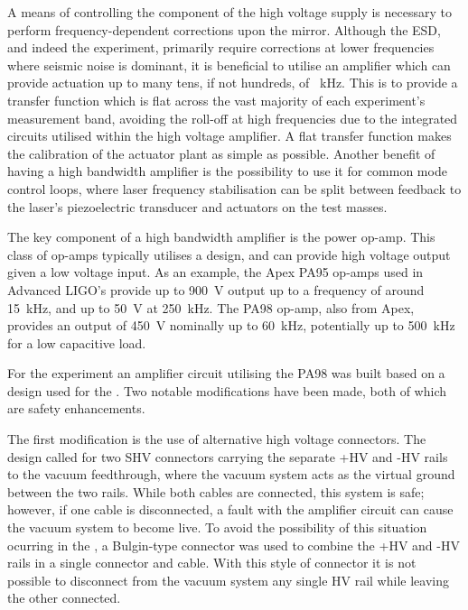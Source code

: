 A means of controlling the \AC{} component of the high voltage supply is necessary to perform frequency-dependent corrections upon the mirror. Although the ESD, and indeed the \SSM{} experiment, primarily require corrections at lower frequencies where seismic noise is dominant, it is beneficial to utilise an amplifier which can provide actuation up to many tens, if not hundreds, of \SI{}{\kilo\hertz}. This is to provide a transfer function which is flat across the vast majority of each experiment's measurement band, avoiding the roll-off at high frequencies due to the integrated circuits utilised within the high voltage amplifier. A flat transfer function makes the calibration of the actuator plant as simple as possible. Another benefit of having a high bandwidth amplifier is the possibility to use it for common mode control loops, where laser frequency stabilisation can be split between feedback to the laser's piezoelectric transducer and actuators on the test masses.

The key component of a high bandwidth amplifier is the power op-amp. This class of op-amps typically utilises a \MOSFET{} design, and can provide high voltage output given a low voltage input. As an example, the Apex PA95 op-amps used in Advanced LIGO's \ESDs{} provide up to \SI{900}{\volt} output up to a frequency of around \SI{15}{\kilo\hertz}, and up to \SI{50}{\volt} at \SI{250}{\kilo\hertz}. The PA98 op-amp, also from Apex, provides an output of \SI{450}{\volt} nominally up to \SI{60}{\kilo\hertz}, potentially up to \SI{500}{\kilo\hertz} for a low capacitive load.


For the \ESD{} experiment an amplifier circuit utilising the PA98 was built based on a design used for the \AEIPROTOTYPE{}. Two notable modifications have been made, both of which are safety enhancements.

The first modification is the use of alternative high voltage connectors. The \AEIPROTOTYPE{} design called for two SHV connectors carrying the separate +HV and -HV rails to the vacuum feedthrough, where the vacuum system acts as the virtual ground between the two rails. While both cables are connected, this system is safe; however, if one cable is disconnected, a fault with the amplifier circuit can cause the vacuum system to become live. To avoid the possibility of this situation ocurring in the \SSM{}, a Bulgin-type connector was used to combine the +HV and -HV rails in a single connector and cable. With this style of connector it is not possible to disconnect from the vacuum system any single HV rail while leaving the other connected.

